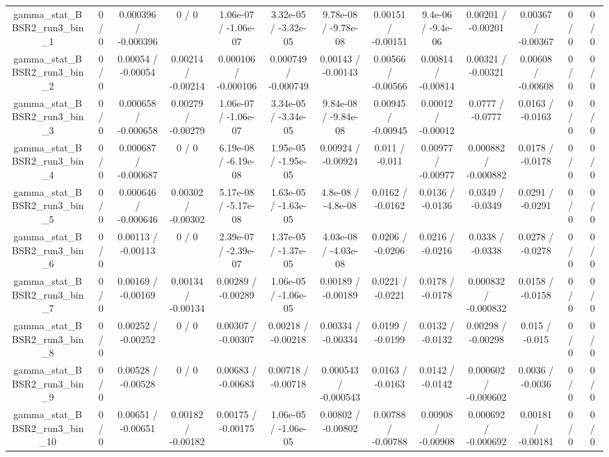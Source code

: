 \documentclass[10pt]{article}
\begin{document}
\begin{table}[htbp]
\begin{center}
\begin{tabular}{|c|c|c|c|c|c|c|c|c|c|c|c|c|}
  gamma_stat_BBSR2_run3_bin_1 & 0 / 0 & 0.000396 / -0.000396 & 0 / 0 & 1.06e-07 / -1.06e-07 & 3.32e-05 / -3.32e-05 & 9.78e-08 / -9.78e-08 & 0.00151 / -0.00151 & 9.4e-06 / -9.4e-06 & 0.00201 / -0.00201 & 0.00367 / -0.00367 & 0 / 0 & 0 / 0 \\ 
  gamma_stat_BBSR2_run3_bin_2 & 0 / 0 & 0.00054 / -0.00054 & 0.00214 / -0.00214 & 0.000106 / -0.000106 & 0.000749 / -0.000749 & 0.00143 / -0.00143 & 0.00566 / -0.00566 & 0.00814 / -0.00814 & 0.00321 / -0.00321 & 0.00608 / -0.00608 & 0 / 0 & 0 / 0 \\ 
  gamma_stat_BBSR2_run3_bin_3 & 0 / 0 & 0.000658 / -0.000658 & 0.00279 / -0.00279 & 1.06e-07 / -1.06e-07 & 3.34e-05 / -3.34e-05 & 9.84e-08 / -9.84e-08 & 0.00945 / -0.00945 & 0.00012 / -0.00012 & 0.0777 / -0.0777 & 0.0163 / -0.0163 & 0 / 0 & 0 / 0 \\ 
  gamma_stat_BBSR2_run3_bin_4 & 0 / 0 & 0.000687 / -0.000687 & 0 / 0 & 6.19e-08 / -6.19e-08 & 1.95e-05 / -1.95e-05 & 0.00924 / -0.00924 & 0.011 / -0.011 & 0.00977 / -0.00977 & 0.000882 / -0.000882 & 0.0178 / -0.0178 & 0 / 0 & 0 / 0 \\ 
  gamma_stat_BBSR2_run3_bin_5 & 0 / 0 & 0.000646 / -0.000646 & 0.00302 / -0.00302 & 5.17e-08 / -5.17e-08 & 1.63e-05 / -1.63e-05 & 4.8e-08 / -4.8e-08 & 0.0162 / -0.0162 & 0.0136 / -0.0136 & 0.0349 / -0.0349 & 0.0291 / -0.0291 & 0 / 0 & 0 / 0 \\ 
  gamma_stat_BBSR2_run3_bin_6 & 0 / 0 & 0.00113 / -0.00113 & 0 / 0 & 2.39e-07 / -2.39e-07 & 1.37e-05 / -1.37e-05 & 4.03e-08 / -4.03e-08 & 0.0206 / -0.0206 & 0.0216 / -0.0216 & 0.0338 / -0.0338 & 0.0278 / -0.0278 & 0 / 0 & 0 / 0 \\ 
  gamma_stat_BBSR2_run3_bin_7 & 0 / 0 & 0.00169 / -0.00169 & 0.00134 / -0.00134 & 0.00289 / -0.00289 & 1.06e-05 / -1.06e-05 & 0.00189 / -0.00189 & 0.0221 / -0.0221 & 0.0178 / -0.0178 & 0.000832 / -0.000832 & 0.0158 / -0.0158 & 0 / 0 & 0 / 0 \\ 
  gamma_stat_BBSR2_run3_bin_8 & 0 / 0 & 0.00252 / -0.00252 & 0 / 0 & 0.00307 / -0.00307 & 0.00218 / -0.00218 & 0.00334 / -0.00334 & 0.0199 / -0.0199 & 0.0132 / -0.0132 & 0.00298 / -0.00298 & 0.015 / -0.015 & 0 / 0 & 0 / 0 \\ 
  gamma_stat_BBSR2_run3_bin_9 & 0 / 0 & 0.00528 / -0.00528 & 0 / 0 & 0.00683 / -0.00683 & 0.00718 / -0.00718 & 0.000543 / -0.000543 & 0.0163 / -0.0163 & 0.0142 / -0.0142 & 0.000602 / -0.000602 & 0.0036 / -0.0036 & 0 / 0 & 0 / 0 \\ 
  gamma_stat_BBSR2_run3_bin_10 & 0 / 0 & 0.00651 / -0.00651 & 0.00182 / -0.00182 & 0.00175 / -0.00175 & 1.06e-05 / -1.06e-05 & 0.00802 / -0.00802 & 0.00788 / -0.00788 & 0.00908 / -0.00908 & 0.000692 / -0.000692 & 0.00181 / -0.00181 & 0 / 0 & 0 / 0 \\ 

\end{tabular}
\end{center}
\end{table}
\end{document}
